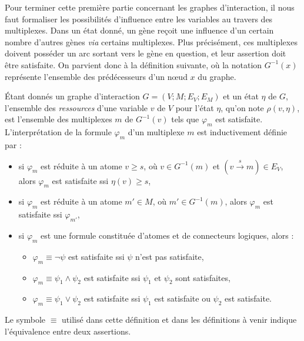 Pour terminer cette première partie concernant les graphes d'interaction, il nous faut formaliser les possibilités d'influence entre les variables au travers des multiplexes. Dans un état donné, un gène reçoit une influence d'un certain nombre d'autres gènes \textit{via} certains multiplexes. Plus précisément, ces multiplexes doivent posséder un arc sortant vers le gène en question, et leur assertion doit être satisfaite. On parvient donc à la définition suivante, où la notation $G^{-1}(x)$ représente l'ensemble des prédécesseurs d'un n\oe ud $x$ du graphe.
\begin{definition}
Étant donnés un graphe d'interaction $G = (V ; M ; E_V ; E_M)$ et un état $\eta$ de $G$, l'ensemble des \emph{ressources} d'une variable $v$ de $V$ pour l'état $\eta$, qu'on note $\rho(v, \eta)$, est l'ensemble des multiplexes $m$ de $G^{-1}(v)$ tels que $\varphi_m$ est satisfaite. L'interprétation de la formule $\varphi_m$ d'un multiplexe $m$ est inductivement définie par :
\begin{itemize}
  \item si $\varphi_m$ est réduite à un atome $v \geq s$, où $v \in G^{-1}(m)$ et $(v \xrightarrow{s} m) \in E_V$, alors $\varphi_m$ est satisfaite ssi $\eta(v) \geq s$,
  \item si $\varphi_m$ est réduite à un atome $m' \in M$, où $m' \in G^{-1}(m)$, alors $\varphi_m$ est satisfaite ssi $\varphi_{m'}$,
  \item si $\varphi_m$ est une formule constituée d'atomes et de connecteurs logiques, alors :
  \begin{itemize}
    \item $\varphi_m \equiv \neg \psi$ est satisfaite ssi $\psi$ n'est pas satisfaite,
    \item $\varphi_m \equiv \psi_1 \wedge \psi_2$ est satisfaite ssi $\psi_1$ et $\psi_2$ sont satisfaites,
    \item $\varphi_m \equiv \psi_1 \vee \psi_2$ est satisfaite ssi $\psi_1$ est satisfaite ou $\psi_2$ est satisfaite.
  \end{itemize}
\end{itemize}
\end{definition}
Le symbole $\equiv$ utilisé dans cette définition et dans les définitions à venir indique l'équivalence entre deux assertions.

